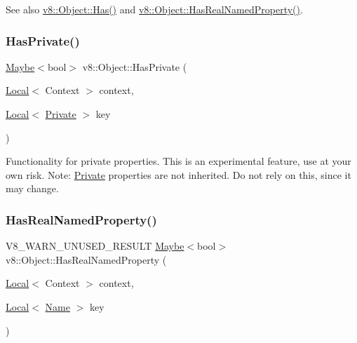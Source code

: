 See also \mbox{\hyperlink{classv8_1_1Object_a57d4819c2cc13715ed22dd23cdc84d7c}{v8\+::\+Object\+::\+Has()}} and \mbox{\hyperlink{classv8_1_1Object_ad830b937c7586fe2086b288ea79935c4}{v8\+::\+Object\+::\+Has\+Real\+Named\+Property()}}. \mbox{\label{classv8_1_1Object_aad699867935fd2142ec97afa6e39a7f0}} 
\subsubsection{\texorpdfstring{Has\+Private()}{HasPrivate()}}
{\footnotesize\ttfamily \mbox{\hyperlink{classv8_1_1Maybe}{Maybe}}$<$bool$>$ v8\+::\+Object\+::\+Has\+Private (\begin{DoxyParamCaption}\item[{\mbox{\hyperlink{classv8_1_1Local}{Local}}$<$ Context $>$}]{context,  }\item[{\mbox{\hyperlink{classv8_1_1Local}{Local}}$<$ \mbox{\hyperlink{classv8_1_1Private}{Private}} $>$}]{key }\end{DoxyParamCaption})}

Functionality for private properties. This is an experimental feature, use at your own risk. Note\+: \mbox{\hyperlink{classv8_1_1Private}{Private}} properties are not inherited. Do not rely on this, since it may change. \mbox{\label{classv8_1_1Object_ad830b937c7586fe2086b288ea79935c4}} 
\subsubsection{\texorpdfstring{Has\+Real\+Named\+Property()}{HasRealNamedProperty()}}
{\footnotesize\ttfamily V8\+\_\+\+W\+A\+R\+N\+\_\+\+U\+N\+U\+S\+E\+D\+\_\+\+R\+E\+S\+U\+LT \mbox{\hyperlink{classv8_1_1Maybe}{Maybe}}$<$bool$>$ v8\+::\+Object\+::\+Has\+Real\+Named\+Property (\begin{DoxyParamCaption}\item[{\mbox{\hyperlink{classv8_1_1Local}{Local}}$<$ Context $>$}]{context,  }\item[{\mbox{\hyperlink{classv8_1_1Local}{Local}}$<$ \mbox{\hyperlink{classv8_1_1Name}{Name}} $>$}]{key }\end{DoxyParamCaption})}

